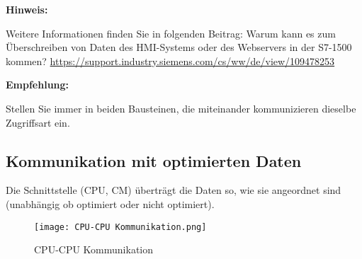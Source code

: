 \noindent \textbf{Hinweis:}\par \noindent
Weitere Informationen finden Sie in folgenden Beitrag: 
Warum kann es zum Überschreiben von Daten des HMI-Systems oder des Webservers in der S7-1500 kommen? 
\url{https://support.industry.siemens.com/cs/ww/de/view/109478253}

\noindent \textbf{Empfehlung:}\par \noindent
Stellen Sie immer in beiden Bausteinen, die miteinander kommunizieren dieselbe Zugriffsart ein.

\subsection{Kommunikation mit optimierten Daten}\label{subsec:Kommunikation mit optimierten Daten}
Die Schnittstelle (CPU, CM) überträgt die Daten so, wie sie angeordnet sind (unabhängig ob optimiert oder nicht optimiert).


\begin{figure}[!ht]
    \centering
    \texttt{[image: CPU-CPU Kommunikation.png]}
    \caption{CPU-CPU Kommunikation}
    \label{fig:CPU-CPU Kommunikation}
\end{figure}